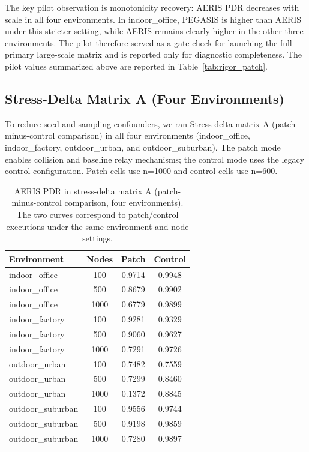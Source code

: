 ﻿\documentclass[sensors,article,submit,moreauthors,pdftex]{Definitions/mdpi}
\begin{document}
The key pilot observation is monotonicity recovery: AERIS PDR decreases with scale in all four environments. In indoor\_office, PEGASIS is higher than AERIS under this stricter setting, while AERIS remains clearly higher in the other three environments. The pilot therefore served as a gate check for launching the full primary large-scale matrix and is reported only for diagnostic completeness.
The pilot values summarized above are reported in Table~\ref{tab:rigor_patch}.

\subsection{Stress-Delta Matrix A (Four Environments)}
To reduce seed and sampling confounders, we ran Stress-delta matrix A (patch-minus-control comparison) in all four environments (indoor\_office, indoor\_factory, outdoor\_urban, and outdoor\_suburban). The patch mode enables collision and baseline relay mechanisms; the control mode uses the legacy control configuration. Patch cells use n=1000 and control cells use n=600.

\begin{table}[H]
\caption{AERIS PDR in stress-delta matrix A (patch-minus-control comparison, four environments). The two curves correspond to patch/control executions under the same environment and node settings.}
\label{tab:s9_patch_control}
\centering
\begin{tabular}{lccc}
\toprule
Environment & Nodes & Patch & Control \\
\midrule
indoor\_office & 100  & 0.9714 & 0.9948 \\
indoor\_office & 500  & 0.8679 & 0.9902 \\
indoor\_office & 1000 & 0.6779 & 0.9899 \\
indoor\_factory & 100  & 0.9281 & 0.9329 \\
indoor\_factory & 500  & 0.9060 & 0.9627 \\
indoor\_factory & 1000 & 0.7291 & 0.9726 \\
outdoor\_urban & 100  & 0.7482 & 0.7559 \\
outdoor\_urban & 500  & 0.7299 & 0.8460 \\
outdoor\_urban & 1000 & 0.1372 & 0.8845 \\
outdoor\_suburban & 100  & 0.9556 & 0.9744 \\
outdoor\_suburban & 500  & 0.9198 & 0.9859 \\
outdoor\_suburban & 1000 & 0.7280 & 0.9897 \\
\bottomrule
\end{tabular}
\end{table}
\end{document}
